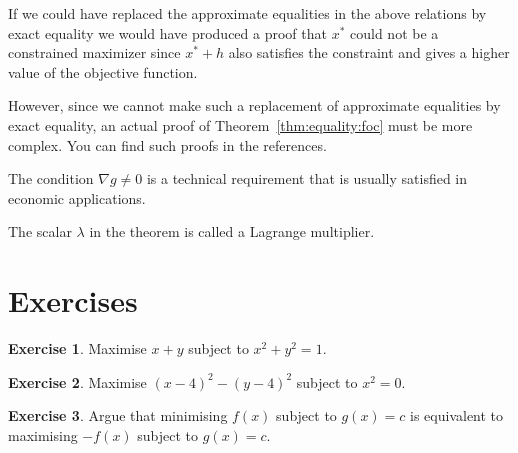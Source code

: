 \documentclass[11pt,reqno,openany]{amsbook}
\numberwithin{figure}{chapter}
\numberwithin{equation}{chapter}
\theoremstyle{plain}
\theoremstyle{definition}
\newtheorem{xca}{Exercise}[chapter]
\begin{document}
If we could have replaced the approximate equalities in the
above relations by exact equality we would have produced a
proof that $x^*$ could not be a constrained maximizer since
$x^*+h$ also satisfies the constraint and gives a higher
value of the objective function.

However, since we cannot make such a replacement of
approximate equalities by exact equality, an actual proof of
Theorem~\ref{thm:equality:foc} must be more complex. You can
find such proofs in the references.

The condition $\nabla g \ne 0$ is a technical requirement
that is usually satisfied in economic applications.

The scalar $\lambda$ in the theorem is called a Lagrange
multiplier.

\section*{Exercises}
\begin{xca}
  Maximise $x+y$ subject to $x^2+y^2=1$.
\end{xca}

\begin{xca}
  Maximise $(x-4)^2-(y-4)^2$ subject to $x^2=0$.
\end{xca}

\begin{xca}
  Argue that minimising $f(x)$ subject to $g(x)=c$ is
  equivalent to maximising $-f(x)$ subject to $g(x)=c$.
\end{xca}
\end{document}
